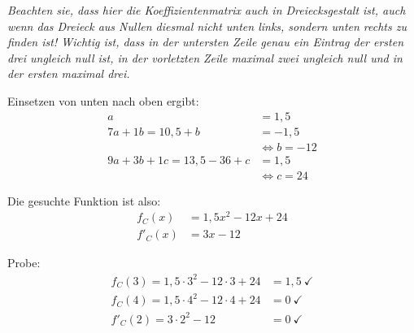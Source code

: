 \documentclass[11pt, a4paper, landscape, twocolumn]{scrartcl}
\begin{document}
\begin{aufgabe}
\begin{loesung}
\begin{description}
				\textit{Beachten sie, dass hier die Koeffizientenmatrix auch in Dreiecksgestalt ist, auch wenn das Dreieck aus Nullen diesmal nicht unten links, sondern unten rechts zu finden ist!
				Wichtig ist, dass in der untersten Zeile genau ein Eintrag der ersten drei ungleich null ist,
				in der vorletzten Zeile maximal zwei ungleich null und in der ersten maximal drei.}
			
			
				Einsetzen von unten nach oben ergibt:
				\begin{align*}
				a &= 1,5 \\
				7a + 1b = 10,5 + b &= -1,5 \\
				&\Leftrightarrow b = -12 \\
				9a + 3b + 1c = 13,5 - 36 + c &= 1,5 \\
				&\Leftrightarrow c = 24
				\end{align*}
				
				Die gesuchte Funktion ist also:
				\begin{align*}
					f_C(x) &= 1,5x^2 - 12x + 24 \\
					f'_C(x) &= 3x - 12
				\end{align*}
				
				Probe:
				\begin{align*}
				f_C(3) = 1,5\cdot 3^2 - 12\cdot 3 + 24 &= 1,5 \ \checkmark \\
				f_C(4) = 1,5\cdot 4^2 - 12\cdot 4 + 24 &= 0 \ \checkmark \\
				f'_C(2) = 3\cdot 2^2 - 12 &= 0 \ \checkmark
				\end{align*}
			\end{description}
		\end{loesung}
	\end{aufgabe}
\end{document}
